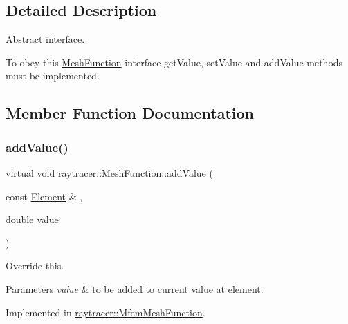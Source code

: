\subsection{Detailed Description}
Abstract interface. 

To obey this \hyperlink{classraytracer_1_1MeshFunction}{Mesh\+Function} interface get\+Value, set\+Value and add\+Value methods must be implemented. 

\subsection{Member Function Documentation}
\mbox{\label{classraytracer_1_1MeshFunction_a134b7ca4400d04030a67cadd691ee879}} 
\subsubsection{\texorpdfstring{add\+Value()}{addValue()}}
{\footnotesize\ttfamily virtual void raytracer\+::\+Mesh\+Function\+::add\+Value (\begin{DoxyParamCaption}\item[{const \hyperlink{classraytracer_1_1Element}{Element} \&}]{,  }\item[{double}]{value }\end{DoxyParamCaption})\hspace{0.3cm}{\ttfamily [pure virtual]}}



Override this. 


\begin{DoxyParams}{Parameters}
{\em value} & to be added to current value at element. \\
\hline
\end{DoxyParams}


Implemented in \hyperlink{classraytracer_1_1MfemMeshFunction_a1c9f0ec943afb1d069ddeb85ee9bb2c8}{raytracer\+::\+Mfem\+Mesh\+Function}.

\mbox{\label{classraytracer_1_1MeshFunction_a49888c1924a473a1d98564a4732edd3a}} 
